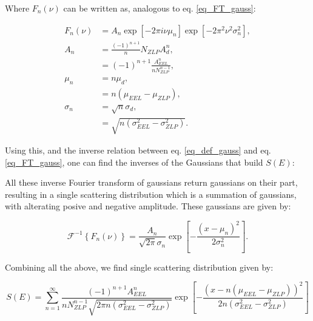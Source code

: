 Where $F_n(\nu)$ can be written as, analogous to eq. \eqref{eq_FT_gauss}:

\begin{equation}
    \begin{aligned}
F_n (\nu)&= A_{n}\exp{[-2\pi i \nu \mu_n]} \exp{[-2\pi^2 \nu^2 \sigma_{n}^2]},\\
A_{n} &= \frac{(-1)^{n+1}}{n} N_{ZLP}A_d^n,\\
&= (-1)^{n+1} \frac{A_{EEL}^n}{n N_{ZLP}^{n-1}}, \\
\mu_n &= n\mu_d,\\
&= n(\mu_{EEL} - \mu_{ZLP}), \\
\sigma_{n} &= \sqrt{n}\sigma_d, \\
&= \sqrt{n(\sigma_{EEL}^2 - \sigma_{ZLP}^2)}.
    \end{aligned}
\end{equation}



Using this, and the inverse relation between eq. \eqref{eq_def_gauss} and eq. \eqref{eq_FT_gauss}, one can find the inverses of the Gaussians that build $S(E)$:

All these inverse Fourier transform of gaussians return gaussians on their part, resulting in a single scattering distribution which is a summation of gaussians, with alterating posive and negative amplitude. These gaussians are given by:

\begin{equation}
\mathcal{F}^{-1}\left\{ F_n(\nu) \right\} = \frac{A_n}{\sqrt{2\pi}\sigma_n} \exp{\left[-\frac{(x-\mu_n)^2}{2\sigma_n^2}\right]}.
\end{equation}


Combining all the above, we find single scattering distribution given by:


\begin{equation}
S(E) = \sum_{n=1}^\infty \frac{(-1)^{n+1} A_{EEL}^n}{n N_{ZLP}^{n-1}\sqrt{2\pi n(\sigma_{EEL}^2 - \sigma_{ZLP}^2)}} \exp{\left[-\frac{(x-n(\mu_{EEL} - \mu_{ZLP}))^2}{2n(\sigma_{EEL}^2 - \sigma_{ZLP}^2)}\right]}
\end{equation}



